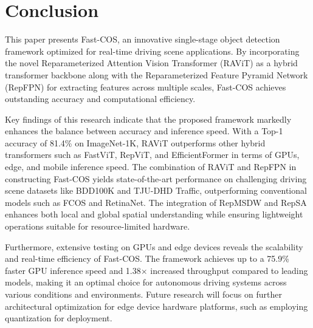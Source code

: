 \section{Conclusion}
This paper presents Fast-COS, an innovative single-stage object detection framework optimized for real-time driving scene applications. By incorporating the novel Reparameterized Attention Vision Transformer (RAViT) as a hybrid transformer backbone along with the Reparameterized Feature Pyramid Network (RepFPN) for extracting features across multiple scales, Fast-COS achieves outstanding accuracy and computational efficiency. 

Key findings of this research indicate that the proposed framework markedly enhances the balance between accuracy and inference speed. With a Top-1 accuracy of 81.4\% on ImageNet-1K, RAViT outperforms other hybrid transformers such as FastViT, RepViT, and EfficientFormer in terms of GPUs, edge, and mobile inference speed. The combination of RAViT and RepFPN in constructing Fast-COS yields state-of-the-art performance on challenging driving scene datasets like BDD100K and TJU-DHD Traffic, outperforming conventional models such as FCOS and RetinaNet. The integration of RepMSDW and RepSA enhances both local and global spatial understanding while ensuring lightweight operations suitable for resource-limited hardware. 

Furthermore, extensive testing on GPUs and edge devices reveals the scalability and real-time efficiency of Fast-COS. The framework achieves up to a 75.9\% faster GPU inference speed and 1.38× increased throughput compared to leading models, making it an optimal choice for autonomous driving systems across various conditions and environments. Future research will focus on further architectural optimization for edge device hardware platforms, such as employing quantization for deployment.